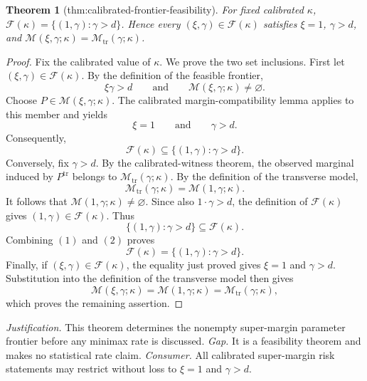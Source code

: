 \documentclass{article}
\newtheorem{theorem}{Theorem}
\begin{document}
\begin{theorem}[thm:calibrated-frontier-feasibility]\label{thm:calibrated-frontier-feasibility}
For fixed calibrated \(\kappa\), \(\mathcal F(\kappa)=\{(1,\gamma):\gamma>d\}\). Hence every \((\xi,\gamma)\in\mathcal F(\kappa)\) satisfies \(\xi=1\), \(\gamma>d\), and \(\mathcal M(\xi,\gamma;\kappa)=\mathcal M_{\mathrm{tr}}(\gamma;\kappa)\).
\end{theorem}
\begin{proof}
Fix the calibrated value of \(\kappa\). We prove the two set inclusions. First let \((\xi,\gamma)\in\mathcal F(\kappa)\). By the definition of the feasible frontier,
\[
\xi\gamma>d
\qquad\text{and}\qquad
\mathcal M(\xi,\gamma;\kappa)\ne\varnothing.
\]
Choose \(P\in\mathcal M(\xi,\gamma;\kappa)\). The calibrated margin-compatibility lemma applies to this member and yields
\[
\xi=1
\qquad\text{and}\qquad
\gamma>d.
\]
Consequently,
\[
\mathcal F(\kappa)\subseteq\{(1,\gamma):\gamma>d\}.
\tag{1}
\]
Conversely, fix \(\gamma>d\). By the calibrated-witness theorem, the observed marginal induced by \(P^{\mathrm{tr}}\) belongs to \(\mathcal M_{\mathrm{tr}}(\gamma;\kappa)\). By the definition of the transverse model,
\[
\mathcal M_{\mathrm{tr}}(\gamma;\kappa)=\mathcal M(1,\gamma;\kappa).
\]
It follows that \(\mathcal M(1,\gamma;\kappa)\ne\varnothing\). Since also \(1\cdot\gamma>d\), the definition of \(\mathcal F(\kappa)\) gives \((1,\gamma)\in\mathcal F(\kappa)\). Thus
\[
\{(1,\gamma):\gamma>d\}\subseteq\mathcal F(\kappa).
\tag{2}
\]
Combining \((1)\) and \((2)\) proves
\[
\mathcal F(\kappa)=\{(1,\gamma):\gamma>d\}.
\]
Finally, if \((\xi,\gamma)\in\mathcal F(\kappa)\), the equality just proved gives \(\xi=1\) and \(\gamma>d\). Substitution into the definition of the transverse model then gives
\[
\mathcal M(\xi,\gamma;\kappa)
=\mathcal M(1,\gamma;\kappa)
=\mathcal M_{\mathrm{tr}}(\gamma;\kappa),
\]
which proves the remaining assertion.
\end{proof}
\par\smallskip\noindent \textit{Justification.} This theorem determines the nonempty super-margin parameter frontier before any minimax rate is discussed. \textit{Gap.} It is a feasibility theorem and makes no statistical rate claim. \textit{Consumer.} All calibrated super-margin risk statements may restrict without loss to \(\xi=1\) and \(\gamma>d\).
\end{document}
